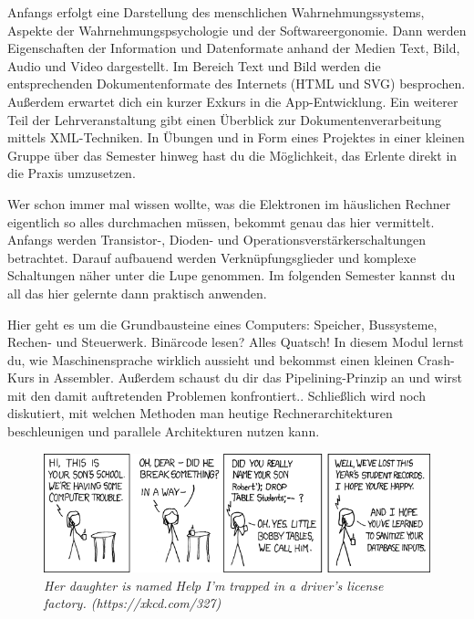 \newpage

Anfangs erfolgt eine Darstellung des menschlichen Wahrnehmungssystems, Aspekte der Wahrnehmungspsychologie und der Softwareergonomie.
Dann werden Eigenschaften der Information und Datenformate anhand der Medien Text, Bild, Audio und Video dargestellt.
Im Bereich Text und Bild werden die entsprechenden Dokumentenformate des Internets (HTML und SVG) besprochen.
Außerdem erwartet dich ein kurzer Exkurs in die App-Entwicklung.
Ein weiterer Teil der Lehrveranstaltung gibt einen Überblick zur Dokumentenverarbeitung mittels XML-Techniken.
In Übungen und in Form eines Projektes in einer kleinen Gruppe über das Semester hinweg hast du die Möglichkeit, das Erlente direkt in die Praxis umzusetzen.

Wer schon immer mal wissen wollte, was die Elektronen im häuslichen Rechner eigentlich so alles durchmachen müssen, bekommt genau das hier vermittelt.
Anfangs werden Transistor-, Dioden- und Operationsverstärkerschaltungen betrachtet.
Darauf aufbauend werden Verknüpfungsglieder und komplexe Schaltungen näher unter die Lupe genommen.
Im folgenden Semester kannst du all das hier gelernte dann praktisch anwenden.

Hier geht es um die Grundbausteine eines Computers:
Speicher, Bussysteme, Rechen- und Steuerwerk.
Binärcode lesen? Alles Quatsch! In diesem Modul lernst du, wie Maschinensprache 
wirklich aussieht und bekommst einen kleinen Crash-Kurs in Assembler.
Außerdem schaust du dir das Pipelining-Prinzip an und wirst mit den damit auftretenden Problemen konfrontiert..
Schließlich wird noch diskutiert, mit welchen Methoden man heutige Rechnerarchitekturen beschleunigen und parallele Architekturen nutzen kann.

\vfill

\begin{figure}[h!]
\centering
\includegraphics[scale=.5]{img/xkcd/exploits_of_a_mom.png}
\caption*{{\small \textit{Her daughter is named Help I'm trapped in a driver's license factory. (https://xkcd.com/327)}}}
\end{figure}

